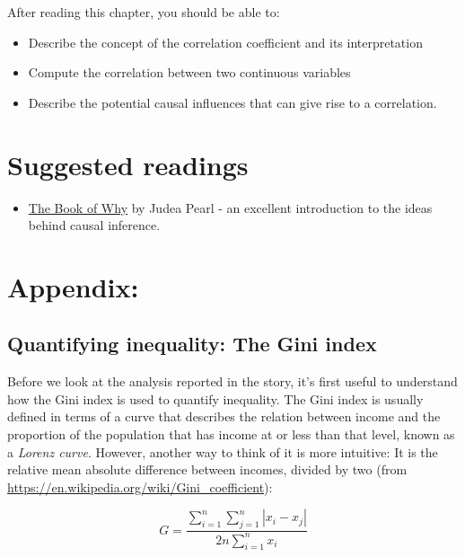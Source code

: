 \documentclass[12pt,]{book}
\providecommand{\tightlist}{%
  \setlength{\itemsep}{0pt}\setlength{\parskip}{0pt}}
\theoremstyle{definition}
\theoremstyle{definition}
\theoremstyle{definition}
\theoremstyle{remark}
\begin{document}
After reading this chapter, you should be able to:

\begin{itemize}
\tightlist
\item
  Describe the concept of the correlation coefficient and its interpretation
\item
  Compute the correlation between two continuous variables
\item
  Describe the potential causal influences that can give rise to a correlation.
\end{itemize}

\hypertarget{suggested-readings-9}{%
\section{Suggested readings}\label{suggested-readings-9}}

\begin{itemize}
\tightlist
\item
  \href{http://bayes.cs.ucla.edu/WHY/}{The Book of Why} by Judea Pearl - an excellent introduction to the ideas behind causal inference.
\end{itemize}

\hypertarget{appendix-4}{%
\section{Appendix:}\label{appendix-4}}

\hypertarget{quantifying-inequality-the-gini-index}{%
\subsection{Quantifying inequality: The Gini index}\label{quantifying-inequality-the-gini-index}}

Before we look at the analysis reported in the story, it's first useful to understand how the Gini index is used to quantify inequality. The Gini index is usually defined in terms of a curve that describes the relation between income and the proportion of the population that has income at or less than that level, known as a \emph{Lorenz curve}. However, another way to think of it is more intuitive: It is the relative mean absolute difference between incomes, divided by two (from \url{https://en.wikipedia.org/wiki/Gini_coefficient}):

\[
G = \frac{\displaystyle{\sum_{i=1}^n \sum_{j=1}^n \left| x_i - x_j \right|}}{\displaystyle{2n\sum_{i=1}^n x_i}} 
\]
\end{document}
